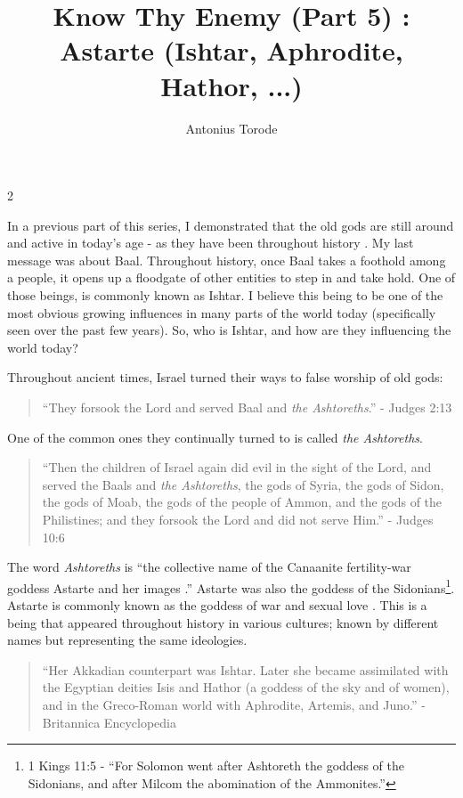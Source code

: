 \documentclass[10pt]{article}
\title{Know Thy Enemy (Part 5) 	: Astarte (Ishtar, Aphrodite, Hathor, ...)}
\author{Antonius Torode}
\begin{document}
\maketitle
\thispagestyle{fancy}



\begin{multicols}{2}

In a previous part of this series, I demonstrated that the old gods are still around and active in today's age - as they have been throughout history \cite{part3}. My last message was about Baal\cite{baal}. Throughout history, once Baal takes a foothold among a people, it opens up a floodgate of other entities to step in and take hold. One of those beings, is commonly known as Ishtar. I believe this being to be one of the most obvious growing influences in many parts of the world today (specifically seen over the past few years). So, who is Ishtar, and how are they influencing the world today?

Throughout ancient times, Israel turned their ways to false worship of old gods:
\begin{quotation}
``They forsook the Lord and served Baal and \textit{the Ashtoreths}.'' - Judges 2:13
\end{quotation}
One of the common ones they continually turned to is called \textit{the Ashtoreths}. 
\begin{quotation}
``Then the children of Israel again did evil in the sight of the Lord, and served the Baals and \textit{the Ashtoreths}, the gods of Syria, the gods of Sidon, the gods of Moab, the gods of the people of Ammon, and the gods of the Philistines; and they forsook the Lord and did not serve Him.'' - Judges 10:6
\end{quotation}
The word \textit{Ashtoreths} is ``the collective name of the Canaanite fertility-war goddess Astarte and her images \cite{Ashtoreths strongs}.'' Astarte was also the goddess of the Sidonians\footnote{1 Kings 11:5 - ``For Solomon went after Ashtoreth the goddess of the Sidonians, and after Milcom the abomination of the Ammonites.''}. Astarte is commonly known as the goddess of war and sexual love \cite{Britannica}. This is a being that appeared throughout history in various cultures; known by different names but representing the same ideologies. 

\begin{quotation}
``Her Akkadian counterpart was Ishtar. Later she became assimilated with the Egyptian deities Isis and Hathor (a goddess of the sky and of women), and in the Greco-Roman world with Aphrodite, Artemis, and Juno.'' - Britannica Encyclopedia\cite{Britannica} 
\end{quotation}


\end{multicols}
\end{document}
